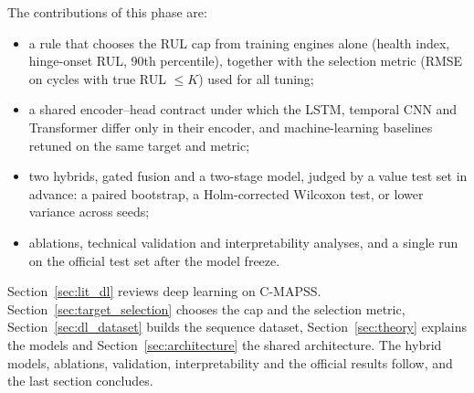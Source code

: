 The contributions of this phase are:
\begin{itemize}
\item a rule that chooses the RUL cap from training engines alone (health
  index, hinge-onset RUL, 90th percentile), together with the selection metric
  (RMSE on cycles with true RUL $\leq K$) used for all tuning;
\item a shared encoder--head contract under which the LSTM, temporal CNN and
  Transformer differ only in their encoder, and machine-learning baselines
  retuned on the same target and metric;
\item two hybrids, gated fusion and a two-stage model, judged by a value test
  set in advance: a paired bootstrap, a Holm-corrected Wilcoxon test, or lower
  variance across seeds;
\item ablations, technical validation and interpretability analyses, and a
  single run on the official test set after the model freeze.
\end{itemize}

Section~\ref{sec:lit_dl} reviews deep learning on C-MAPSS.
Section~\ref{sec:target_selection} chooses the cap and the selection metric,
Section~\ref{sec:dl_dataset} builds the sequence dataset,
Section~\ref{sec:theory} explains the models and Section~\ref{sec:architecture}
the shared architecture. The hybrid models, ablations, validation,
interpretability and the official results follow, and the last section
concludes.
